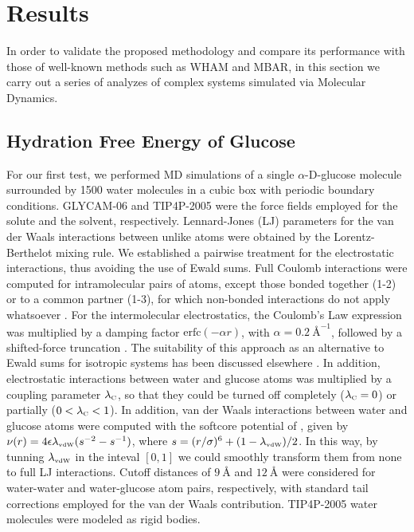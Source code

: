 \documentclass[journal=jctcce,manuscript=article,layout=twocolumn]{achemso}
\begin{document}
\section{Results}

In order to validate the proposed methodology and compare its performance with those of well-known methods such as WHAM and MBAR, in this section we carry out a series of analyzes of complex systems simulated via Molecular Dynamics.

\subsection{Hydration Free Energy of Glucose}
\label{sec:solvation free energy}

For our first test, we performed MD simulations of a single \mbox{$\alpha$-D-glucose} molecule surrounded by 1500 water molecules in a cubic box with periodic boundary conditions. GLYCAM-06 \cite{Kirschner_2007} and TIP4P-2005 \cite{Abascal_2005} were the force fields employed for the solute and the solvent, respectively. Lennard-Jones (LJ) parameters for the van der Waals interactions between unlike atoms were obtained by the Lorentz-Berthelot mixing rule. We established a pairwise treatment for the electrostatic interactions, thus avoiding the use of Ewald sums. Full Coulomb interactions were computed for intramolecular pairs of atoms, except those bonded together (\mbox{1-2}) or to a common partner (\mbox{1-3}), for which non-bonded interactions do not apply whatsoever \cite{Kirschner_2007}. For the intermolecular electrostatics, the Coulomb's Law expression was multiplied by a damping factor $\text{erfc}(-\alpha r)$, with $\alpha = 0.2~\text{\AA}^{-1}$, followed by a shifted-force truncation \cite{Allen_1987}. The suitability of this approach as an alternative to Ewald sums for isotropic systems has been discussed elsewhere \cite{Fennell_2006}. In addition, electrostatic interactions between water and glucose atoms was multiplied by a coupling parameter $\lambda_\text{\tiny C}$, so that they could be turned off completely ($\lambda_\text{\tiny C} = 0$) or partially ($0 < \lambda_\text{\tiny C} < 1$). In addition, van der Waals interactions between water and glucose atoms were computed with the softcore potential of \citeauthor{Beutler_1994} \cite{Beutler_1994}, given by $\nu(r) = 4 \epsilon \lambda_\text{\tiny vdW} (s^{-2} - s^{-1})$, where $s = (r/\sigma)^6 + (1 - \lambda_\text{\tiny vdW})/2$. In this way, by tunning $\lambda_\text{\tiny vdW}$ in the inteval $[0,1]$ we could smoothly transform them from none to full LJ interactions. Cutoff distances of $9~\text{\AA}$ and $12~\text{\AA}$ were considered for water-water and water-glucose atom pairs, respectively, with standard tail corrections employed for the van der Waals contribution. TIP4P-2005 \cite{Abascal_2005} water molecules were modeled as rigid bodies.
\end{document}
